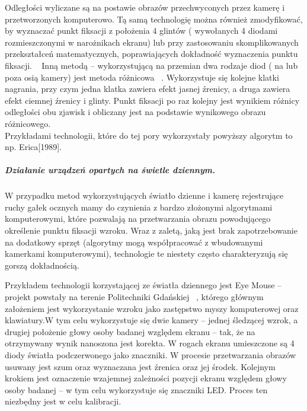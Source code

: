 \documentclass[twoside,a4paper]{book}
\begin{document}
Odległości wyliczane są  na postawie obrazów przechwyconych  przez kamerę i przetworzonych komputerowo.  
Tą samą technologię można również zmodyfikować, by wyznaczać punkt fiksacji  z położenia 4 glintów ( wywołanych 4 diodami rozmieszczonymi w narożnikach ekranu) lub przy zastosowaniu skomplikowanych  przekształceń matematycznych,  poprawiających dokładność  wyznaczenia punktu fiksacji. ~\cite{kunkaFiksacja}
Inną metodą – wykorzystującą  na przemian dwa rodzaje diod ( na lub poza osią kamery) jest metoda różnicowa ~\cite{kunkaFiksacja}. Wykorzystuje się kolejne klatki nagrania, przy czym jedna klatka zawiera efekt jasnej źrenicy, a druga zawiera efekt ciemnej źrenicy i glinty. Punkt fiksacji po raz kolejny jest wynikiem różnicy odległości obu zjawisk i obliczany jest na podstawie wynikowego obrazu różnicowego.\\
Przykładami technologii, które do tej pory wykorzystały powyższy algorytm to np. Erica[1989].
\subparagraph{Działanie urządzeń  opartych na świetle dziennym. }
W przypadku  metod  wykorzystujących światło dzienne i kamerę rejestrujące ruchy gałek ocznych mamy do czynienia z bardzo złożonymi algorytmami komputerowymi, które pozwalają na przetwarzania obrazu powodującego określenie punktu fiksacji wzroku. Wraz z zaletą, jaką jest brak zapotrzebowanie na dodatkowy sprzęt (algorytmy mogą współpracować z wbudowanymi kamerkami komputerowymi), technologie te niestety często charakteryzują się gorszą dokładnością.

Przykładem technologii korzystającej ze światła dziennego jest Eye Mouse – projekt powstały na terenie Politechniki Gdańskiej ~\cite{eyemouse}, którego głównym założeniem jest wykorzystanie wzroku jako zastępstwo myszy komputerowej oraz klawiatury.W tym celu wykorzystuje się dwie kamery – jednej śledzącej wzrok, a drugiej położenie głowy osoby badanej względem ekranu – tak, że na otrzymywany wynik nanoszona jest korekta.  W rogach ekranu umieszczone są 4 diody światła podczerwonego jako znaczniki. W procesie przetwarzania obrazów usuwany jest szum oraz wyznaczana jest źrenica oraz jej środek. Kolejnym krokiem jest oznaczenie wzajemnej zależności pozycji ekranu względem głowy osoby badanej – w tym celu wykorzystuje się znaczniki LED. Proces ten niezbędny jest w celu kalibracji.
\end{document}
